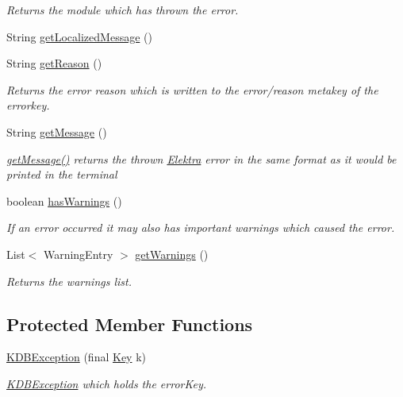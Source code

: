 \begin{DoxyCompactItemize}
\begin{DoxyCompactList}\small\item\em Returns the module which has thrown the error. \end{DoxyCompactList}\item 
String \hyperlink{classorg_1_1libelektra_1_1exception_1_1KDBException_a80c8598787cff127a83290c87450dde0}{get\+Localized\+Message} ()
\item 
String \hyperlink{classorg_1_1libelektra_1_1exception_1_1KDBException_ab3883ac714dca52759f08aaee708cab0}{get\+Reason} ()
\begin{DoxyCompactList}\small\item\em Returns the error reason which is written to the {\ttfamily error/reason} metakey of the errorkey. \end{DoxyCompactList}\item 
String \hyperlink{classorg_1_1libelektra_1_1exception_1_1KDBException_a78bbf7b7767f90840ba6bdb22bebfe11}{get\+Message} ()
\begin{DoxyCompactList}\small\item\em \hyperlink{classorg_1_1libelektra_1_1exception_1_1KDBException_a78bbf7b7767f90840ba6bdb22bebfe11}{get\+Message()} returns the thrown \hyperlink{interfaceorg_1_1libelektra_1_1Elektra}{Elektra} error in the same format as it would be printed in the terminal \end{DoxyCompactList}\item 
boolean \hyperlink{classorg_1_1libelektra_1_1exception_1_1KDBException_a0387189fd5d08448c81a7777f80f8940}{has\+Warnings} ()
\begin{DoxyCompactList}\small\item\em If an error occurred it may also has important warnings which caused the error. \end{DoxyCompactList}\item 
List$<$ Warning\+Entry $>$ \hyperlink{classorg_1_1libelektra_1_1exception_1_1KDBException_ac2dcd24734f48de0f1b288b06e3a5383}{get\+Warnings} ()
\begin{DoxyCompactList}\small\item\em Returns the warnings list. \end{DoxyCompactList}\end{DoxyCompactItemize}
\subsection*{Protected Member Functions}
\begin{DoxyCompactItemize}
\item 
\hyperlink{classorg_1_1libelektra_1_1exception_1_1KDBException_a872741690ba68b12b14edc32e4675eef}{K\+D\+B\+Exception} (final \hyperlink{classorg_1_1libelektra_1_1Key}{Key} k)
\begin{DoxyCompactList}\small\item\em \hyperlink{classorg_1_1libelektra_1_1exception_1_1KDBException}{K\+D\+B\+Exception} which holds the error\+Key. \end{DoxyCompactList}\end{DoxyCompactItemize}


